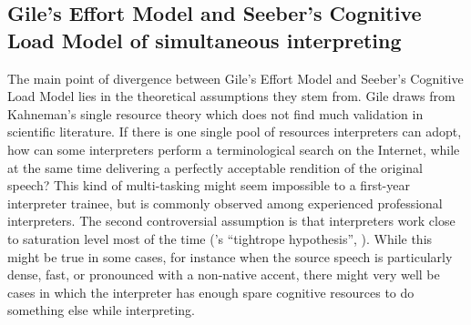 \documentclass[output=paper]{langsci/langscibook}
\begin{document}
\subsection{Gile’s Effort Model and Seeber’s Cognitive Load Model of simultaneous interpreting}\label{sec:prandi:2.1}
The main point of divergence between Gile’s Effort Model \citep{Gile1988, Gile1997, Gile1999} and Seeber’s Cognitive Load Model lies in the theoretical assumptions they stem from. Gile draws from Kahneman’s single resource theory \citep{Kahneman1973}\linebreak which does not find much validation in scientific literature. If there is one single pool of resources interpreters can adopt, how can some interpreters perform a terminological search on the Internet, while at the same time delivering a perfectly acceptable rendition of the original speech? This kind of multi-tasking might seem impossible to a first-year interpreter trainee, but is commonly observed among experienced professional interpreters. The second controversial assumption is that interpreters work close to saturation level most of the time (\citeauthor{Gile1999}’s ``tightrope hypothesis'', \citeyear{Gile1999}). While this might be true in some cases, for instance when the source speech is particularly dense, fast, or pronounced with a non-native accent, there might very well be cases in which the interpreter has enough spare cognitive resources to do something else while interpreting. 
\end{document}
